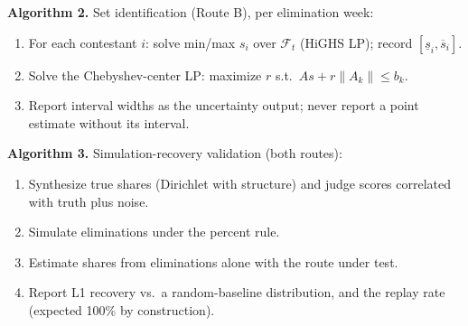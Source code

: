 \documentclass[12pt]{article}
\begin{document}
\noindent\textbf{Algorithm 2.} Set identification (Route B), per elimination week:
\begin{enumerate}
\item For each contestant $i$: solve min/max $s_i$ over $\mathcal{F}_t$ (HiGHS LP);
record $[\underline{s}_i, \overline{s}_i]$.
\item Solve the Chebyshev-center LP: maximize $r$ s.t.\ $A s + r \|A_k\| \le b_k$.
\item Report interval widths as the uncertainty output; never report a point
estimate without its interval.
\end{enumerate}

\noindent\textbf{Algorithm 3.} Simulation-recovery validation (both routes):
\begin{enumerate}
\item Synthesize true shares (Dirichlet with structure) and judge scores correlated
with truth plus noise.
\item Simulate eliminations under the percent rule.
\item Estimate shares from eliminations alone with the route under test.
\item Report L1 recovery vs.\ a random-baseline distribution, and the replay rate
(expected 100\% by construction).
\end{enumerate}
\end{document}
